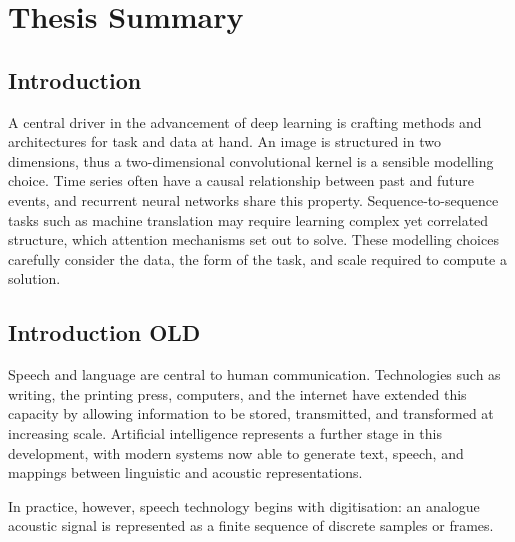 \chapter{Thesis Summary}
\label{chap:commentary}

\section{Introduction}

A central driver in the advancement of deep learning is crafting methods and architectures for task and data at hand. An image is structured in two dimensions, thus a two-dimensional convolutional kernel is a sensible modelling choice. Time series often have a causal relationship between past and future events, and recurrent neural networks share this property. Sequence-to-sequence tasks such as machine translation may require learning complex yet correlated structure, which attention mechanisms set out to solve. These modelling choices carefully consider the data, the form of the task, and scale required to compute a solution.









\section{Introduction OLD}


Speech and language are central to human communication. Technologies such as writing, the printing press, computers, and the internet have extended this capacity by allowing information to be stored, transmitted, and transformed at increasing scale. Artificial intelligence represents a further stage in this development, with modern systems now able to generate text, speech, and mappings between linguistic and acoustic representations. 

In practice, however, speech technology begins with digitisation: an analogue acoustic signal is represented as a finite sequence of discrete samples or frames.

